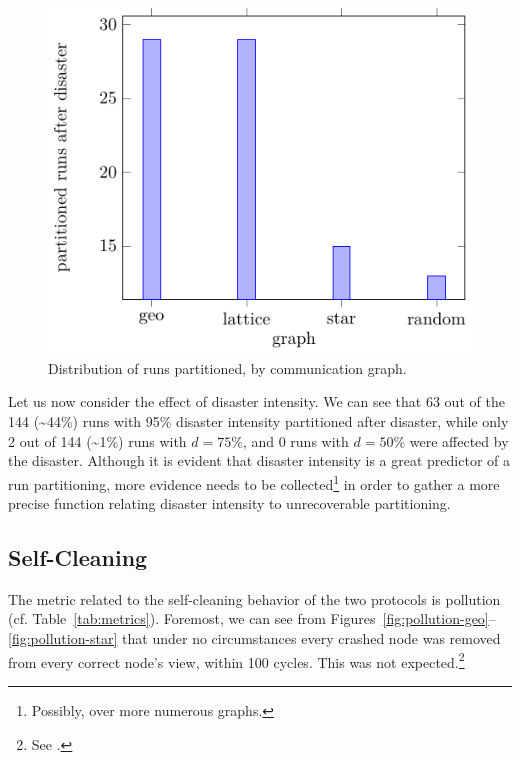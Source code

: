\documentclass[a4paper]{ifacconf}
\begin{document}
\begin{figure}
    \centering
    \includegraphics[width=\linewidth]{"figures/partitioned after disaster graph"}
    \caption{Distribution of runs partitioned, by communication graph.}
    \label{fig:partitioned-after-disaster-graph}
\end{figure}

Let us now consider the effect of disaster intensity.
We can see that 63 out of the 144 (\textasciitilde 44\%) runs with 95\% disaster intensity partitioned after disaster, while only 2 out of 144 (\textasciitilde 1\%) runs with $d = 75\%$, and 0 runs with $d = 50\%$ were affected by the disaster.
Although it is evident that disaster intensity is a great predictor of a run partitioning, more evidence needs to be collected\footnote{%
    Possibly, over more numerous graphs.
} in order to gather a more precise function relating disaster intensity to unrecoverable partitioning.

\subsection{Self-Cleaning}

The metric related to the self-cleaning behavior of the two protocols is pollution (cf. Table~\ref{tab:metrics}).
Foremost, we can see from Figures~\ref{fig:pollution-geo}--\ref{fig:pollution-star} that under no circumstances every crashed node was removed from every correct node's view, within 100 cycles.
This was not expected.\footnote{%
    See \cite[p.~17]{slides}.
}
\end{document}
